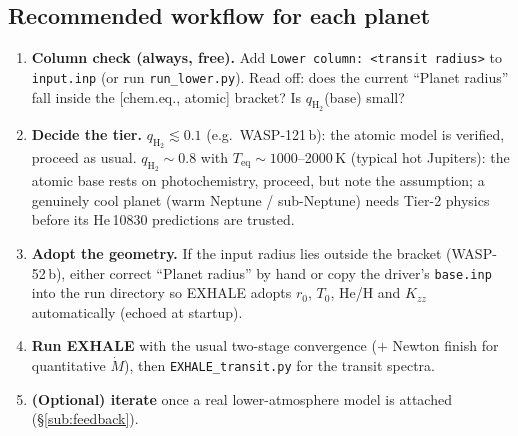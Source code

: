 \documentclass[english,a4paper]{my_memo}
\newcommand{\Mdot}{\dot{M}}
\newcommand{\qHH}{q_{\mathrm{H_2}}}
\begin{document}
\subsection{Recommended workflow for each planet}
\begin{enumerate}
\item \textbf{Column check (always, free).} Add \texttt{Lower column: <transit radius>}
  to \texttt{input.inp} (or run \texttt{run\_lower.py}). Read off: does the current
  ``Planet radius'' fall inside the [chem.eq., atomic] bracket? Is $\qHH$(base) small?
\item \textbf{Decide the tier.} $\qHH\lesssim0.1$ (e.g.\ WASP-121\,b): the atomic model
  is verified, proceed as usual. $\qHH\sim0.8$ with $T_\mathrm{eq}\sim1000$--2000\,K
  (typical hot Jupiters): the atomic base rests on photochemistry, proceed, but note
  the assumption; a genuinely cool planet (warm Neptune / sub-Neptune) needs Tier-2
  physics before its He\,10830 predictions are trusted.
\item \textbf{Adopt the geometry.} If the input radius lies outside the bracket
  (WASP-52\,b), either correct ``Planet radius'' by hand or copy the driver's
  \texttt{base.inp} into the run directory so EXHALE adopts $r_0$, $T_0$, He/H and
  $K_{zz}$ automatically (echoed at startup).
\item \textbf{Run EXHALE} with the usual two-stage convergence ($+$ Newton finish for
  quantitative $\Mdot$), then \texttt{EXHALE\_}\allowbreak\texttt{transit.py} for
  the transit spectra.
\item \textbf{(Optional) iterate} once a real lower-atmosphere model is attached
  (\S\ref{sub:feedback}).
\end{enumerate}
\end{document}
